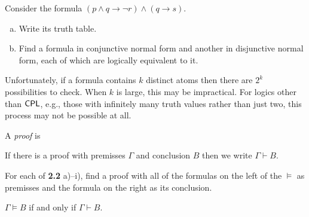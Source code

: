 \documentclass{article}
\begin{document}
\begin{prob}{3.1}
    Consider the formula $(p \wedge q \to \neg r) \wedge (q \to s)$.
    \begin{enumerate}[a)]
        \item Write its truth table.
        \item Find a formula in conjunctive normal form and another in disjunctive normal form, each of which are logically equivalent to it.
    \end{enumerate}
\end{prob}

Unfortunately, if a formula contains $k$ distinct atoms then there are $2^k$ possibilities to check. When $k$ is large, this may be impractical. For logics other than $\mathsf{CPL}$, e.g., those with infinitely many truth values rather than just two, this process may not be possible at all.

\begin{definition}
    A \emph{proof} is 
\end{definition}

\begin{notation}
    If there is a proof with premisses $\Gamma$ and conclusion $B$ then we write $\Gamma \vdash B$.
\end{notation}

\begin{prob}{3.2}
For each of \textbf{2.2} a)--i), find a proof with all of the formulas on the left of the $\vDash$ as premisses and the formula on the right as its conclusion.
\end{prob}

\begin{proposition}
    $\Gamma \models B$ if and only if $\Gamma \vdash B$.
\end{proposition}
\end{document}
